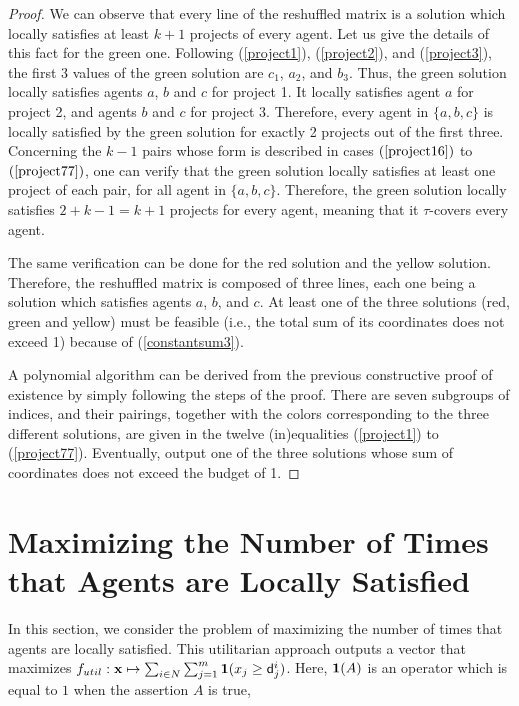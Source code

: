 \documentclass{article}
\begin{document}
\begin{proof}
We can observe that every line of the reshuffled matrix is a solution which locally satisfies at least $k+1$ projects of every agent. Let us give the details of this fact for the green one. Following (\ref{project1}), (\ref{project2}), and (\ref{project3}),  the first 3 values of the green solution are $c_1$, $a_2$, and $b_3$. Thus, the green solution locally satisfies agents $a$, $b$ and $c$ for project 1. It locally satisfies agent $a$ for project 2, and agents $b$ and $c$ for project 3. Therefore, every agent in $\{a,b,c\}$ is locally satisfied by the green solution for exactly 2 projects out of the first three. Concerning the $k-1$ pairs whose form is described in cases $(\ref{project16})$ to $(\ref{project77})$, one can verify that the green solution locally satisfies at least one project of each pair, for all agent in $\{a,b,c\}$. Therefore, the green solution locally satisfies $2+k-1=k+1$ projects for every agent, meaning that it $\tau$-covers every agent. 

The same verification can be done for the red solution and the yellow solution. Therefore, the reshuffled matrix is composed of three lines, each one being a solution which satisfies agents $a$, $b$, and $c$.   At least one of the three solutions (red, green and yellow) must be feasible (i.e., the total sum of its coordinates does not exceed 1) because of (\ref{constantsum3}).


A polynomial algorithm can be derived from the previous constructive proof of existence by
simply following the steps of the proof. There are seven subgroups of indices, and their pairings, together with the colors corresponding to the three different solutions, are given in the twelve (in)equalities (\ref{project1}) to (\ref{project77}). Eventually,  output one of the three solutions whose sum of coordinates does not exceed the budget of 1.\end{proof}


\section{Maximizing the Number of Times that Agents are Locally Satisfied} \label{sec:dp:util}

In this section, we consider the problem of maximizing the number of times that agents are locally satisfied. This utilitarian approach outputs a vector that maximizes $f_{util}: {\bf x} \mapsto \sum_{i \in N} \sum_{j=1}^m {\bf 1}(x_j \ge {\sf d}^i _j)$. Here, ${\bf 1}(A)$ is an  
operator which is equal to $1$ when the assertion $A$ is true, 
\end{document}
